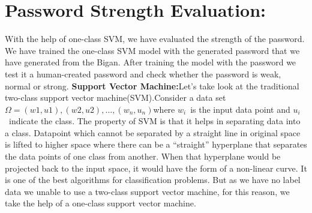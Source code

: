 \documentclass[runningheads]{llncs}
\begin{document}
\section{Password Strength Evaluation:}
With the help of one-class SVM, we have evaluated the strength of the password. We have trained the one-class SVM model\cite{1437839} with the generated password that we have generated from the Bigan. After training the model with the password we test it a human-created password and check whether the password is weak, normal or strong.
\newline
\textbf{Support Vector Machine:}Let's take look at the traditional two-class support vector machine(SVM).Consider a data set $Ω={(w1,u1),(w2,u2),…,(w_n,u_n)}$\;where $w_i$\ is the input data point and $u_i$\ indicate the class. The property of SVM is that it helps in separating data into a class. Datapoint which cannot be separated by a straight line in original space is lifted to higher space where there can be a “straight” hyperplane that separates the data points of one class from another. When that hyperplane would be projected back to the input space, it would have the form of a non-linear curve. It is one of the best algorithms for classification problems. But as we have no label data we unable to use a two-class support vector machine, for this reason, we take the help of a one-class support vector machine.
\end{document}
